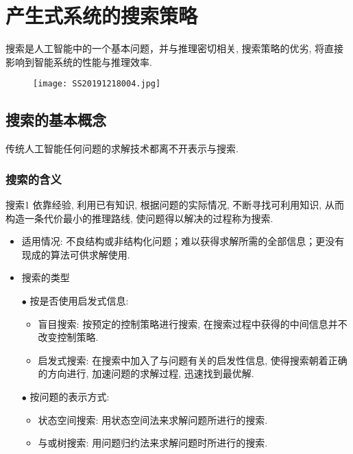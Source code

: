 \chapter{产生式系统的搜索策略}\label{AIchap4}
\begin{tcolorbox}[colback=white!50,colframe=orange!50,title=搜索]
搜索是人工智能中的一个基本问题，并与推理密切相关, 搜索策略的优劣, 将直接影响到智能系统的性能与推理效率.\hfill
\end{tcolorbox}
\begin{figure}[H]
\centering
\texttt{[image: SS20191218004.jpg]}
\label{SS20191218004}
\end{figure}
\section{搜索的基本概念}
传统人工智能任何问题的求解技术都离不开表示与搜索.
\subsection{搜索的含义}
\begin{mydef}{搜索}{1}
依靠经验, 利用已有知识, 根据问题的实际情况, 不断寻找可利用知识, 从而构造一条代价最小的推理路线, 使问题得以解决的过程称为搜索.
\end{mydef}

\begin{itemize}
\item 适用情况: 不良结构或非结构化问题；难以获得求解所需的全部信息；更没有现成的算法可供求解使用.
\item 搜索的类型

    $\bullet$ 按是否使用启发式信息:
    \begin{itemize}
        \item 盲目搜索: 按预定的控制策略进行搜索, 在搜索过程中获得的中间信息并不改变控制策略.
        \item 启发式搜索: 在搜索中加入了与问题有关的启发性信息, 使得搜索朝着正确的方向进行, 加速问题的求解过程, 迅速找到最优解.
    \end{itemize}
    $\bullet$ 按问题的表示方式:
    \begin{itemize}
        \item 状态空间搜索: 用状态空间法来求解问题所进行的搜索.
        \item 与或树搜索: 用问题归约法来求解问题时所进行的搜索.
    \end{itemize}
\end{itemize}
